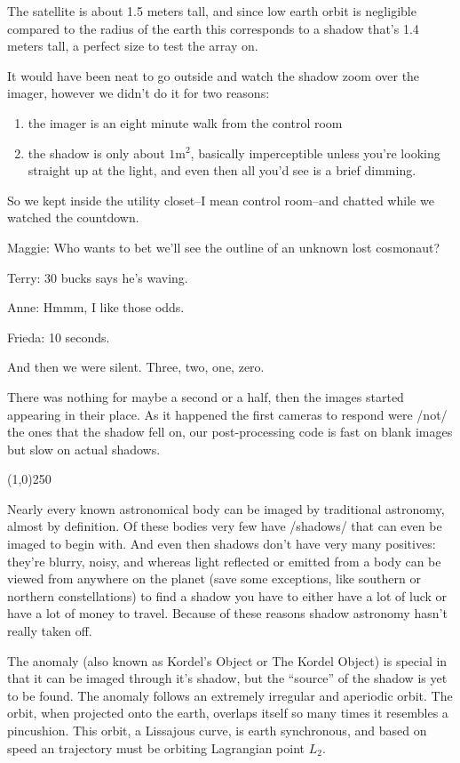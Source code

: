 \documentclass[a5paper,10pt]{book}
\newcommand{\interlude}{\begin{center}
\line(1,0){250}
\end{center}}
\newenvironment{dialogue}
{
\it
\renewcommand{\:}{\rm:}
\PushPreHook{par}{\it}

\begin{changemargin}{ 0.4 in}{ 0.4in}
\addtolength{\parskip}{0.1em}
}
{
\addtolength{\parskip}{-0.1em}
\end{changemargin}

\PopPreHook{par}
}
\begin{document}
The satellite is about 1.5 meters tall, and since low earth orbit is negligible compared to the radius of the earth this corresponds to a shadow that's 1.4 meters tall, a perfect size to test the array on.

It would have been neat to go outside and watch the shadow zoom over the imager, however we didn't do it for two reasons:

\begin{enumerate}
  \item the imager is an eight minute walk from the control room

  \item the shadow is only about $1\mathrm{m}^2$, basically imperceptible unless you're looking straight up at the light, and even then all you'd see is a brief dimming.
\end{enumerate}

So we kept inside the utility closet--I mean control room--and chatted while we watched the countdown. 

\begin{dialogue}
  Maggie\: Who wants to bet we'll see the outline of an unknown lost cosmonaut?

  Terry\: 30 bucks says he's waving.

  Anne\: Hmmm, I like those odds.

  Frieda\: 10 seconds.
\end{dialogue}

And then we were silent. Three, two, one, zero.

There was nothing for maybe a second or a half, then the images started appearing in their place. As it happened the first cameras to respond were /not/ the ones that the shadow fell on, our post-processing code is fast on blank images but slow on actual shadows. 

\interlude

Nearly every known astronomical body can be imaged by traditional astronomy, almost by definition. Of these bodies very few have /shadows/ that can even be imaged to begin with. And even then shadows don't have very many positives: they're blurry, noisy, and whereas light reflected or emitted from a body can be viewed from anywhere on the planet (save some exceptions, like southern or northern constellations) to find a shadow you have to either have a lot of luck or have a lot of money to travel. Because of these reasons shadow astronomy hasn't really taken off.

The anomaly (also known as Kordel's Object or The Kordel Object) is special in that it can be imaged through it's shadow, but the ``source'' of the shadow is yet to be found. The anomaly follows an extremely irregular and aperiodic orbit. The orbit, when projected onto the earth, overlaps itself so many times it resembles a pincushion. This orbit, a Lissajous curve, is earth synchronous, and based on speed an trajectory must be orbiting Lagrangian point $L_2$.
\end{document}
